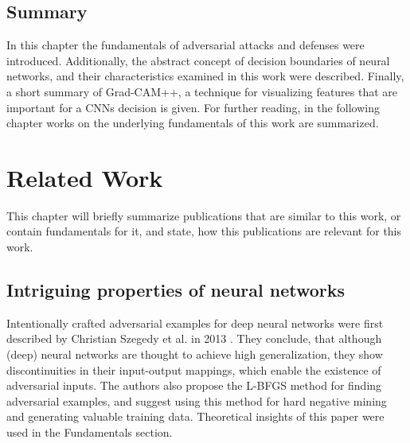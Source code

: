 \documentclass[draft,final]{vutinfth} %
\begin{document}
\section{Summary}

In this chapter the fundamentals of adversarial attacks and defenses were introduced.
Additionally, the abstract concept of decision boundaries of neural networks, and their characteristics examined in this work were described.
Finally, a short summary of Grad-CAM++, a technique for visualizing features that are important for a CNNs decision is given.
For further reading, in the following chapter works on the underlying fundamentals of this work are summarized.

\chapter{Related Work}

This chapter will briefly summarize publications that are similar to this work, or contain fundamentals for it, and state, how this publications are relevant for this work.

\section{Intriguing properties of neural networks}

Intentionally crafted adversarial examples for deep neural networks were first described by Christian Szegedy et al. in 2013 \cite{Szegedy2013}.
They conclude, that although (deep) neural networks are thought to achieve high generalization, they show discontinuities in their input-output mappings, which enable the existence of adversarial inputs.
The authors also propose the L-BFGS method for finding adversarial examples, and suggest using this method for hard negative mining and generating valuable training data.
Theoretical insights of this paper were used in the Fundamentals section.\\
\end{document}

